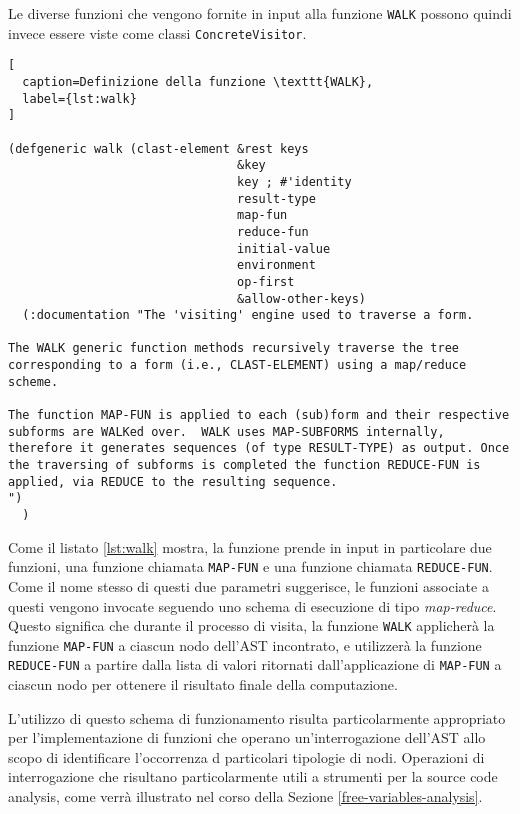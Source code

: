 Le diverse funzioni che vengono fornite in input alla funzione \texttt{WALK}
possono quindi invece essere viste come classi \texttt{ConcreteVisitor}.\\

\begin{lstlisting}[
  caption=Definizione della funzione \texttt{WALK},
  label={lst:walk}
]

(defgeneric walk (clast-element &rest keys
                                &key
                                key ; #'identity
                                result-type
                                map-fun
                                reduce-fun
                                initial-value
                                environment
                                op-first
                                &allow-other-keys)
  (:documentation "The 'visiting' engine used to traverse a form.

The WALK generic function methods recursively traverse the tree
corresponding to a form (i.e., CLAST-ELEMENT) using a map/reduce
scheme.

The function MAP-FUN is applied to each (sub)form and their respective
subforms are WALKed over.  WALK uses MAP-SUBFORMS internally,
therefore it generates sequences (of type RESULT-TYPE) as output. Once
the traversing of subforms is completed the function REDUCE-FUN is
applied, via REDUCE to the resulting sequence.
")
  )

\end{lstlisting}

Come il listato \ref{lst:walk} mostra, la funzione prende in input in
particolare due funzioni, una funzione chiamata \texttt{MAP-FUN} e una funzione
chiamata \texttt{REDUCE-FUN}. Come il nome stesso di questi due parametri
suggerisce, le funzioni associate a questi vengono invocate seguendo uno schema
di esecuzione di tipo \textit{map-reduce}. Questo significa che durante il
processo di visita, la funzione \texttt{WALK} applicherà la funzione \texttt
{MAP-FUN} a ciascun nodo dell'AST incontrato, e utilizzerà la funzione \texttt
{REDUCE-FUN} a partire dalla lista di valori ritornati dall'applicazione di
\texttt{MAP-FUN} a ciascun nodo per ottenere il risultato finale della
computazione.

L'utilizzo di questo schema di funzionamento risulta particolarmente appropriato
per l'implementazione di funzioni che operano un'interrogazione dell'AST allo
scopo di identificare l'occorrenza d particolari tipologie di nodi. Operazioni
di interrogazione che risultano particolarmente utili a strumenti per la source
code analysis, come verrà illustrato nel corso della Sezione
\ref{free-variables-analysis}.\\

